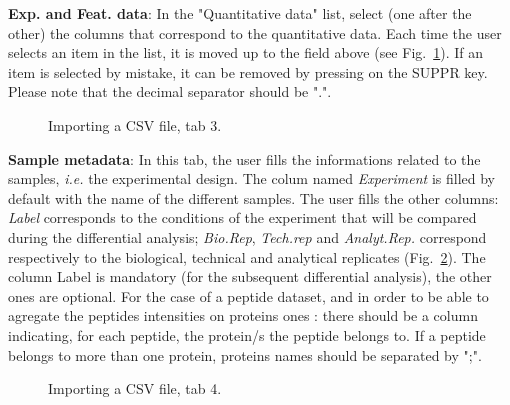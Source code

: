 \documentclass[12pt]{article}
\begin{document}
\textbf {Exp. and Feat. data}: In the "Quantitative data" list, select (one 
after the other) the columns that correspond to the quantitative data. 
Each time the user selects an item in the list, it is moved up to the field 
above (see Fig.~\ref{fig:imp3}). If an item is selected by mistake, it can be 
removed by pressing on the SUPPR key.
\newline Please note that the decimal separator should be ".". 
\begin {figure}
\centering
{}
\caption{Importing a CSV file, tab 3.}\label{fig:imp3}
\end {figure}

\textbf {Sample metadata}: In this tab, the user fills the informations 
related to the samples, \textit{i.e.} the experimental design. The colum named 
\emph{Experiment} is filled by default with the name of the different samples. 
The user fills the other columns: 
\emph{Label} corresponds to the conditions of the experiment that will be 
compared during the differential analysis; \emph{Bio.Rep}, \emph{Tech.rep} 
and \emph{Analyt.Rep.} correspond respectively to the biological, technical 
and analytical replicates (Fig.~\ref{fig:imp4}). The column Label is 
mandatory (for the subsequent differential analysis), the other ones are 
optional.
\newline For the case of a peptide dataset, and in order to be able to agregate
the peptides intensities on proteins ones : there should be a column indicating,
for each peptide, the protein/s the peptide belongs to. If a peptide belongs to
more than one protein, proteins names should be separated by ";".  
\begin {figure}
\centering
{}
\caption{Importing a CSV file, tab 4.}\label{fig:imp4}
\end {figure}
\end{document}
